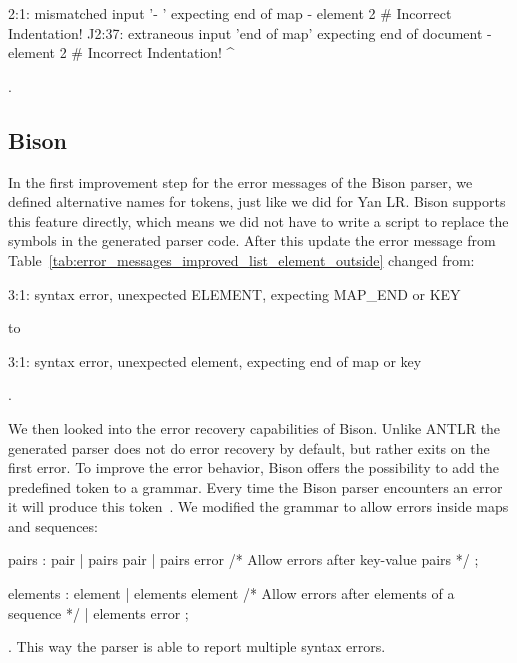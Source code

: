 \begin{textcode}
2:1: mismatched input '- ' expecting end of map
     - element 2 # Incorrect Indentation!
     ^^
2:37: extraneous input 'end of map' expecting end of document
      - element 2 # Incorrect Indentation!
                                          ^
\end{textcode}

.

\subsection{Bison}

In the first improvement step for the error messages of the Bison parser, we defined alternative names for tokens, just like we did for Yan LR. Bison supports this feature directly, which means we did not have to write a script to replace the symbols in the generated parser code. After this update the error message from Table~\ref{tab:error_messages_improved_list_element_outside} changed from:

\begin{textcode}
  3:1: syntax error, unexpected ELEMENT, expecting MAP_END or KEY
\end{textcode}

to

\begin{textcode}
  3:1: syntax error, unexpected element, expecting end of map or key
\end{textcode}

.

We then looked into the error recovery capabilities of Bison. Unlike ANTLR the generated parser does not do error recovery by default, but rather exits on the first error. To improve the error behavior, Bison offers the possibility to add the predefined  token to a grammar. Every time the Bison parser encounters an error it will produce this token~\cite{donnelly2019bison}. We modified the grammar to allow errors inside  maps and sequences:

\begin{ccode}
  pairs : pair
        | pairs pair
        | pairs error /* Allow errors after key-value pairs */
        ;

  elements : element
           | elements element
           /* Allow errors after elements of a sequence */
           | elements error
           ;
\end{ccode}

. This way the parser is able to report multiple syntax errors.


